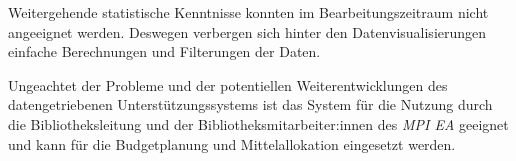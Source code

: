 


Weitergehende statistische Kenntnisse konnten im Bearbeitungszeitraum nicht angeeignet werden. Deswegen verbergen sich hinter den Datenvisualisierungen einfache Berechnungen und Filterungen der Daten.


Ungeachtet der Probleme und der potentiellen Weiterentwicklungen des datengetriebenen Unterstützungssystems ist das System für die Nutzung durch die Bibliotheksleitung und der Bibliotheksmitarbeiter:innen des \textit{\acrlong{MPI EA}} 
geeignet und kann für die Budgetplanung und Mittelallokation eingesetzt werden.